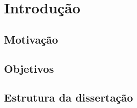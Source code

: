 \chapter{Introdução}
\label{chapter1}

\newpage
\section{Motivação}
\label{motivation}


\section{Objetivos}
\label{objectives}


\section{Estrutura da dissertação}
\label{outline}





